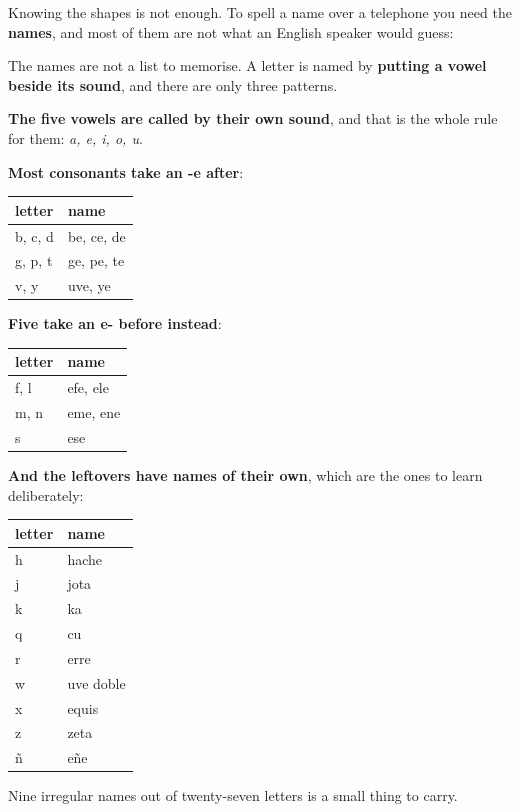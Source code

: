 \begin{grammarlens}[title={Grammar Lens: the letters, and what each is called}]
Knowing the shapes is not enough. To spell a name over a telephone you need the \textbf{names}, and most of them are not what an English speaker would guess:

The names are not a list to memorise. A letter is named by \textbf{putting a vowel beside its sound}, and there are only three patterns.

\textbf{The five vowels are called by their own sound}, and that is the whole rule for them: \emph{a, e, i, o, u}.

\textbf{Most consonants take an -e after}:

\noindent
\begin{tabularx}{\linewidth}{@{}>{\raggedright\arraybackslash}X>{\raggedright\arraybackslash}X@{}}
\toprule
\textbf{letter} & \textbf{name} \\
\midrule
b, c, d & be, ce, de \\
g, p, t & ge, pe, te \\
v, y & uve, ye \\
\bottomrule
\end{tabularx}

\textbf{Five take an e- before instead}:

\noindent
\begin{tabularx}{\linewidth}{@{}>{\raggedright\arraybackslash}X>{\raggedright\arraybackslash}X@{}}
\toprule
\textbf{letter} & \textbf{name} \\
\midrule
f, l & efe, ele \\
m, n & eme, ene \\
s & ese \\
\bottomrule
\end{tabularx}

\textbf{And the leftovers have names of their own}, which are the ones to learn deliberately:

\noindent
\begin{tabularx}{\linewidth}{@{}>{\raggedright\arraybackslash}X>{\raggedright\arraybackslash}X@{}}
\toprule
\textbf{letter} & \textbf{name} \\
\midrule
h & hache \\
j & jota \\
k & ka \\
q & cu \\
r & erre \\
w & uve doble \\
x & equis \\
z & zeta \\
ñ & eñe \\
\bottomrule
\end{tabularx}

Nine irregular names out of twenty-seven letters is a small thing to carry.
\end{grammarlens}

